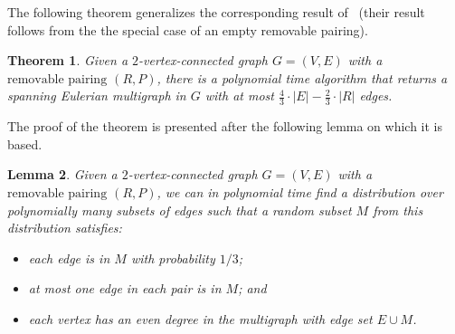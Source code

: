 \documentclass[letterpaper,11pt]{article}
\newtheorem{theorem}{Theorem}[section]
\newtheorem{lemma}[theorem]{Lemma}
\newcommand{\MS}{\ensuremath{\mbox{removable pairing}}\xspace}
\begin{document}
The following theorem generalizes the corresponding result of~\cite{MMP90} (their
result follows from the the special case of an empty removable pairing).
\begin{theorem}
\label{thm:main}
Given a $2$-vertex-connected graph $G=(V,E)$ with a \MS{} $(R,P)$,
there is a polynomial time algorithm that returns a
 spanning Eulerian
multigraph in $G$ with at most
  $\frac{4}{3}\cdot |E| - \frac{2}{3} \cdot |R|$ edges.
\end{theorem}
The proof of the  theorem is presented after the following lemma on which it is based.
\begin{lemma}
\label{lemma:sample}
Given a $2$-vertex-connected graph $G=(V,E)$ with a \MS{} $(R,P)$, we
can in polynomial time find a distribution over polynomially many
subsets of edges such that a random subset $M$ from this distribution
satisfies:
\vspace{-0.2cm}
\begin{itemize}\itemsep-1mm
\item[(a)] each edge is in $M$ with probability $1/3$;
\item[(b)] at most one edge in each pair is in $M$; and
\item[(c)] each vertex has an even degree in the multigraph with edge set $E
  \cup M$.
\end{itemize}
\end{lemma}
\end{document}
